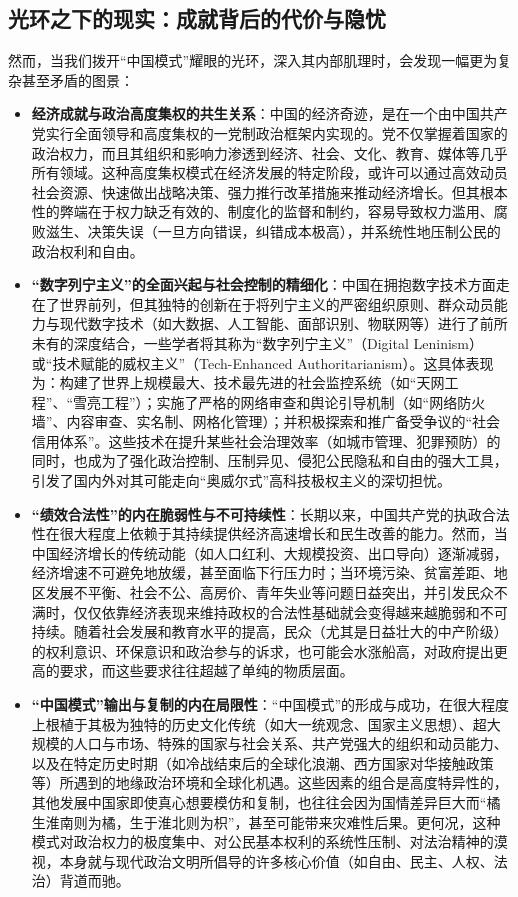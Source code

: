 \documentclass[UTF8, 10pt]{ctexbook}
\begin{document}
\subsection{光环之下的现实：成就背后的代价与隐忧}
然而，当我们拨开“中国模式”耀眼的光环，深入其内部肌理时，会发现一幅更为复杂甚至矛盾的图景：
\begin{itemize}
    \item \textbf{经济成就与政治高度集权的共生关系}：中国的经济奇迹，是在一个由中国共产党实行全面领导和高度集权的一党制政治框架内实现的。党不仅掌握着国家的政治权力，而且其组织和影响力渗透到经济、社会、文化、教育、媒体等几乎所有领域。这种高度集权模式在经济发展的特定阶段，或许可以通过高效动员社会资源、快速做出战略决策、强力推行改革措施来推动经济增长。但其根本性的弊端在于权力缺乏有效的、制度化的监督和制约，容易导致权力滥用、腐败滋生、决策失误（一旦方向错误，纠错成本极高），并系统性地压制公民的政治权利和自由。
    \item \textbf{“数字列宁主义”的全面兴起与社会控制的精细化}：中国在拥抱数字技术方面走在了世界前列，但其独特的创新在于将列宁主义的严密组织原则、群众动员能力与现代数字技术（如大数据、人工智能、面部识别、物联网等）进行了前所未有的深度结合，一些学者将其称为“数字列宁主义”（Digital Leninism）或“技术赋能的威权主义”（Tech-Enhanced Authoritarianism）。这具体表现为：构建了世界上规模最大、技术最先进的社会监控系统（如“天网工程”、“雪亮工程”）；实施了严格的网络审查和舆论引导机制（如“网络防火墙”、内容审查、实名制、网格化管理）；并积极探索和推广备受争议的“社会信用体系”。这些技术在提升某些社会治理效率（如城市管理、犯罪预防）的同时，也成为了强化政治控制、压制异见、侵犯公民隐私和自由的强大工具，引发了国内外对其可能走向“奥威尔式”高科技极权主义的深切担忧。
    \item \textbf{“绩效合法性”的内在脆弱性与不可持续性}：长期以来，中国共产党的执政合法性在很大程度上依赖于其持续提供经济高速增长和民生改善的能力。然而，当中国经济增长的传统动能（如人口红利、大规模投资、出口导向）逐渐减弱，经济增速不可避免地放缓，甚至面临下行压力时；当环境污染、贫富差距、地区发展不平衡、社会不公、高房价、青年失业等问题日益突出，并引发民众不满时，仅仅依靠经济表现来维持政权的合法性基础就会变得越来越脆弱和不可持续。随着社会发展和教育水平的提高，民众（尤其是日益壮大的中产阶级）的权利意识、环保意识和政治参与的诉求，也可能会水涨船高，对政府提出更高的要求，而这些要求往往超越了单纯的物质层面。
    \item \textbf{“中国模式”输出与复制的内在局限性}：“中国模式”的形成与成功，在很大程度上根植于其极为独特的历史文化传统（如大一统观念、国家主义思想）、超大规模的人口与市场、特殊的国家与社会关系、共产党强大的组织和动员能力、以及在特定历史时期（如冷战结束后的全球化浪潮、西方国家对华接触政策等）所遇到的地缘政治环境和全球化机遇。这些因素的组合是高度特异性的，其他发展中国家即使真心想要模仿和复制，也往往会因为国情差异巨大而“橘生淮南则为橘，生于淮北则为枳”，甚至可能带来灾难性后果。更何况，这种模式对政治权力的极度集中、对公民基本权利的系统性压制、对法治精神的漠视，本身就与现代政治文明所倡导的许多核心价值（如自由、民主、人权、法治）背道而驰。

\end{itemize}
\end{document}
